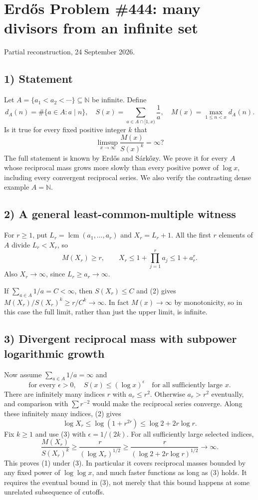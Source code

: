 \section{Erd\H{o}s Problem \#444: many divisors from an infinite set}
\noindent Partial reconstruction, 24 September 2026.

\subsection*{1) Statement}
Let $A=\{a_1<a_2<\cdots\}\subseteq\mathbb N$ be infinite. Define
\[d_A(n)=\#\{a\in A:a\mid n\},\quad
S(x)=\sum_{a\in A\cap[1,x)}\frac1a,\quad
M(x)=\max_{1\le n<x}d_A(n).\]
Is it true for every fixed positive integer $k$ that
\[\limsup_{x\to\infty}\frac{M(x)}{S(x)^k}=\infty?\tag{1}\]
The full statement is known by Erd\H{o}s and S\'ark\H{o}zy. We prove it for every $A$ whose reciprocal mass grows more slowly than every positive power of $\log x$, including every convergent reciprocal series. We also verify the contrasting dense example $A=\mathbb N$.

\subsection*{2) A general least-common-multiple witness}
For $r\ge1$, put $L_r=\operatorname{lcm}(a_1,\ldots,a_r)$ and $X_r=L_r+1$. All the first $r$ elements of $A$ divide $L_r<X_r$, so
\[M(X_r)\ge r,\qquad
X_r\le1+\prod_{j=1}^r a_j\le1+a_r^r.\tag{2}\]
Also $X_r\to\infty$, since $L_r\ge a_r\to\infty$.

If $\sum_{a\in A}1/a=C<\infty$, then $S(X_r)\le C$ and (2) gives $M(X_r)/S(X_r)^k\ge r/C^k\to\infty$. In fact $M(x)\to\infty$ by monotonicity, so in this case the full limit, rather than just the upper limit, is infinite.

\subsection*{3) Divergent reciprocal mass with subpower logarithmic growth}
Now assume $\sum_{a\in A}1/a=\infty$ and
\[\text{for every }\epsilon>0,\quad S(x)\le(\log x)^\epsilon
\quad\text{for all sufficiently large }x.\tag{3}\]
There are infinitely many indices $r$ with $a_r\le r^2$. Otherwise $a_r>r^2$ eventually, and comparison with $\sum r^{-2}$ would make the reciprocal series converge. Along these infinitely many indices, (2) gives
\[\log X_r\le\log(1+r^{2r})\le\log2+2r\log r.\tag{4}\]
Fix $k\ge1$ and use (3) with $\epsilon=1/(2k)$. For all sufficiently large selected indices,
\[\frac{M(X_r)}{S(X_r)^k}
\ge\frac r{(\log X_r)^{1/2}}
\ge\frac r{(\log2+2r\log r)^{1/2}}
\longrightarrow\infty.\]
This proves (1) under (3). In particular it covers reciprocal masses bounded by any fixed power of $\log\log x$, and much faster functions as long as (3) holds. It requires the eventual bound in (3), not merely that this bound happens at some unrelated subsequence of cutoffs.

